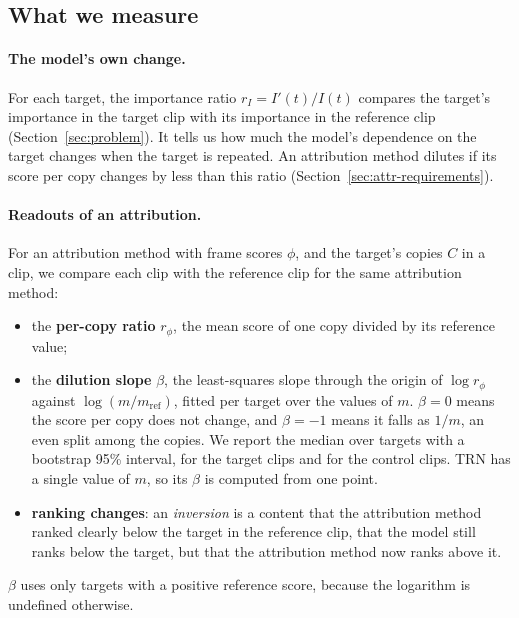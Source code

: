 \subsection{What we measure}
\label{sec:readouts}

\paragraph{The model's own change.}
For each target, the importance ratio $r_I = I'(t)/I(t)$ compares the target's importance in the target clip with its importance in the reference clip (Section~\ref{sec:problem}).
It tells us how much the model's dependence on the target changes when the target is repeated.
An attribution method dilutes if its score per copy changes by less than this ratio (Section~\ref{sec:attr-requirements}).

\paragraph{Readouts of an attribution.}
For an attribution method with frame scores $\phi$, and the target's copies $C$ in a clip, we compare each clip with the reference clip for the same attribution method:
\begin{itemize}
  \item the \textbf{per-copy ratio} $r_\phi$, the mean score of one copy divided by its reference value;
  \item the \textbf{dilution slope} $\beta$, the least-squares slope through the origin of $\log r_\phi$ against $\log(m / m_{\mathrm{ref}})$, fitted per target over the values of $m$. $\beta = 0$ means the score per copy does not change, and $\beta = -1$ means it falls as $1/m$, an even split among the copies. We report the median over targets with a bootstrap 95\% interval, for the target clips and for the control clips. TRN has a single value of $m$, so its $\beta$ is computed from one point.
  \item \textbf{ranking changes}: an \emph{inversion} is a content that the attribution method ranked clearly below the target in the reference clip, that the model still ranks below the target, but that the attribution method now ranks above it.
\end{itemize}
$\beta$ uses only targets with a positive reference score, because the logarithm is undefined otherwise.
